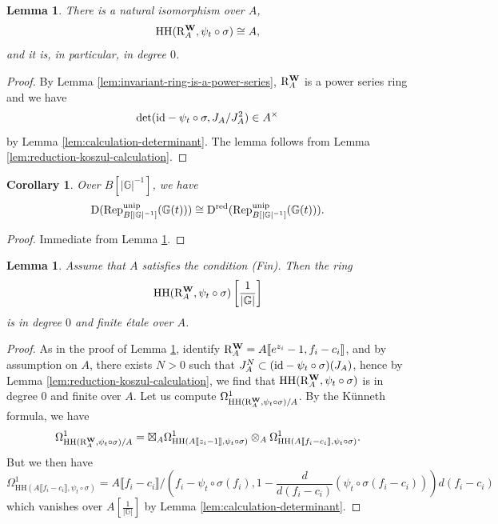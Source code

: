 \documentclass[a4paper, 10pt, oneside, reqno]{amsart}
\theoremstyle{plain}
\newtheorem{lem}[thm]{Lemma}
\newtheorem{corol}[thm]{Corollary}
\theoremstyle{definition}
\theoremstyle{remark}
\newcommand{\Gbb}{\mathbb{G}}
\newcommand{\RR}{\mathrm{R}}
\newcommand{\HHH}{\mathrm{HH}}
\begin{document}
\begin{lem}\label{lem:generic-ring-of-invariants}
There is a natural isomorphism over $A$, 
$$\HHH(\RR_{A}^{\Wbf}, \psi_t \circ \sigma) \cong A,$$
and it is, in particular, in degree $0$. 
\end{lem}

\begin{proof}
By Lemma \ref{lem:invariant-ring-is-a-power-series}, $\RR_{A}^{\Wbf}$ is a power series ring and we have 
$$\det(\mathrm{id} - \psi_t \circ \sigma, J_A/J_A^2) \in A^{\times}$$
by Lemma \ref{lem:calculation-determinant}. The lemma follows from Lemma \ref{lem:reduction-koszul-calculation}. 
\end{proof}

\begin{corol}\label{cor:generically-category-is-reduced}
Over $B[|\Gbb|^{-1}]$, we have 
$$\DD(\Rep^{\unip}_{B[|\Gbb|^{-1}]}(\Gbb(t))) \cong \DD^{\red}(\Rep^{\unip}_{B[|\Gbb|^{-1}]}(\Gbb(t))).$$
\end{corol}

\begin{proof}
Immediate from Lemma \ref{lem:generic-ring-of-invariants}.
\end{proof}

\begin{lem}\label{lem:finite-etale}
Assume that $A$ satisfies the condition (Fin). Then the ring 
$$\HHH(\RR_A^{\Wbf}, \psi_t \circ \sigma)\left[\frac{1}{|\Gbb|}\right]$$
is in degree $0$ and finite étale over $A$.
\end{lem}

\begin{proof}
As in the proof of Lemma \ref{lem:generic-ring-of-invariants}, identify $\RR_A^{\Wbf} = A\llbracket e^{z_i} - 1, f_i - c_i \rrbracket$, and by assumption on $A$, there exists $N > 0$ such that $J_A^N \subset (\mathrm{id} - \psi_t \circ \sigma)(J_A)$, hence by Lemma \ref{lem:reduction-koszul-calculation}, we find that $\HHH(\RR_A^{\Wbf}, \psi_t \circ \sigma)$ is in degree $0$ and finite over $A$. Let us compute $\Omega^1_{\HHH(\RR_A^{\Wbf}, \psi_t \circ \sigma)/A}$. By the Künneth formula, we have 
$$\Omega^1_{\HHH(\RR_A^{\Wbf}, \psi_t \circ \sigma)/A} = \boxtimes_A \Omega^1_{\HHH(A\llbracket z_i-1\rrbracket, \psi_t \circ \sigma)} \otimes_ A\Omega^1_{\HHH(A\llbracket f_i-c_i \rrbracket, \psi_t \circ \sigma)}.$$
But we then have 
$$ \Omega^1_{\HHH(A\llbracket f_i-c_i \rrbracket, \psi_t \circ \sigma)} = A\llbracket f_i-c_i \rrbracket/(f_i - \psi_t \circ \sigma(f_i), 1 - \frac{d}{d(f_i - c_i)}(\psi_t \circ \sigma(f_i-c_i)))d(f_i - c_i)$$
which vanishes over $A\left[\frac{1}{|\Gbb|}\right]$ by Lemma \ref{lem:calculation-determinant}.
\end{proof}
\end{document}
